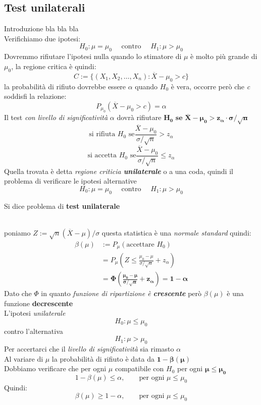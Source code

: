 \documentclass[]{article}
\begin{document}
    \subsection{Test unilaterali}
    Introduzione bla bla bla \\
    Verifichiamo due ipotesi:
    \[ H_0 : \mu = \mu_0 \quad \text{ contro } \quad H_1 : \mu > \mu_0 \]
    Dovremmo rifiutare l'ipotesi nulla quando lo stimatore di $\mu$ è molto più grande di $\mu_0$, la regione critica è quindi:
    \[ C := \{ (X_1, X_2, \ldots, X_n) : \overline{X} - \mu_0 > c \} \]
    la probabilità di rifiuto dovrebbe essere $\alpha$ quando $H_0$ è vera, occorre però che \textit{c} soddisfi la relazione:
    \[ P_{\mu_0} (\overline{X} - \mu_0 > c) = \alpha \]
    Il test \textit{con livello di significatività} $\alpha$ dovrà rifiutare $\boldsymbol{H_0 \text{ se } \overline{X} - \mu_0 > z_\alpha \cdot \sigma / \sqrt{n}}$
    \[ \text{si rifiuta } H_0 \text{ se} \frac{\overline{X} - \mu_0}{\sigma / \sqrt{n}} > z_\alpha \]
    \[ \text{si accetta } H_0 \text{ se} \frac{\overline{X} - \mu_0}{\sigma / \sqrt{n}} \leq z_\alpha \]
    Quella trovata è detta \textit{regione criticia \textbf{unilaterale}} o a una coda, quindi il problema di verificare le ipotesi alternative
    \[ H_0 : \mu = \mu_0 \quad \text{ contro } \quad H_1 : \mu > \mu_0 \]
    \centerline{Si dice problema di \textbf{test unilaterale}} \\[2ex]
    poniamo $Z := \sqrt{n}(\overline{X} - \mu) / \sigma$ questa statistica è una \textit{normale standard} quindi:
    \begin{equation*}
        \begin{split}
            \beta(\mu) &:= P_\mu(\text{accettare } H_0) \\
            &= P_\mu \left( Z \leq \frac{\mu_0 - \mu}{\sigma / \sqrt{n}} + z_\alpha \right) \\
            &= \boldsymbol{\Phi \left( \frac{\mu_0 - \mu}{\sigma / \sqrt{n}} + z_\alpha \right) = 1 - \alpha}
        \end{split}
    \end{equation*}
    Dato che $\Phi$ in quanto \textit{funzione di ripartizione è \textbf{crescente}} però $\beta(\mu)$ è una funzione \textbf{decrescente} \\
    L'ipotesi \textit{unilaterale}
    \[ H_0 : \mu \leq \mu_0 \]
    contro l'alternativa
    \[ H_1 : \mu > \mu_0 \]
    Per accertarci che il \textit{livello di significatività} sia rimasto $\alpha$ \\
    Al variare di $\mu$ la probabilità di rifiuto è data da $\boldsymbol{1 - \beta(\mu)}$ \\
    Dobbiamo verificare che per ogni $\mu$ compatibile con $H_0$ per ogni $\boldsymbol{\mu \leq \mu_0}$ 
    \[ 1 - \beta(\mu) \leq \alpha, \qquad \text{per ogni } \mu \leq \mu_0 \]
    Quindi:
    \[ \beta(\mu) \geq 1 - \alpha, \qquad \text{per ogni } \mu \leq \mu_0 \]
\end{document}
